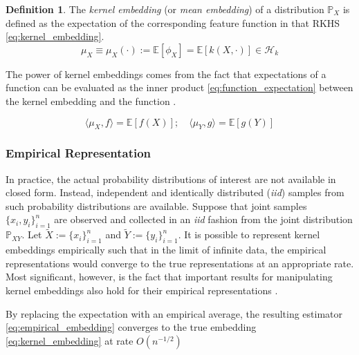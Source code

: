\documentclass[twoside]{article} \usepackage{aistats2017}
\theoremstyle{definition}
\newtheorem{definition}{Definition}[section]
\theoremstyle{theorem}
\newcommand{\rv}[1]{{#1}}
\newcommand{\ds}[1]{\tilde{#1}}
\newcommand{\expect}[1]{{\mathbb{E}[#1]}}
\newcommand{\inner}[2]{{\langle #1, #2 \rangle}}
\newcommand{\Hk}{\mathcal{H}_{k}}
\newcommand{\muX}{\mu_{\rv{X}}}
\newcommand{\muY}{\mu_{\rv{Y}}}
\newcommand{\phiX}{\phi_{\rv{X}}}
\begin{document}
		\begin{definition} \label{def:kernel_embedding}
			\citep{smola2007hilbert}
			The \textit{kernel embedding} (or \textit{mean embedding}) of a distribution $\mathbb{P}_{\rv{X}}$ is defined as the expectation of the corresponding feature function in that RKHS \eqref{eq:kernel_embedding}.
			\begin{equation}
				\muX \equiv \muX(\cdot) := \expect{\phiX} = \expect{k(\rv{X}, \cdot)} \in \Hk
			\label{eq:kernel_embedding}
			\end{equation}
		\end{definition}
		
		The power of kernel embeddings comes from the fact that expectations of a function can be evaluated as the inner product \eqref{eq:function_expectation} between the kernel embedding and the function \citep{muandet2016kernel}.
		
		\begin{equation}
			\inner{\muX}{f} = \expect{f(\rv{X})} ;\quad \inner{\muY}{g} = \expect{g(\rv{Y})}
		\label{eq:function_expectation}
		\end{equation}

		
		\subsubsection{Empirical Representation}
		\label{sec:background:kernel_embeddings:empirical_representation}
			
			In practice, the actual probability distributions of interest are not available in closed form. Instead, independent and identically distributed (\textit{iid}) samples from such probability distributions are available. Suppose that joint samples $\{x_{i}, y_{i}\}_{i = 1}^{n}$ are observed and collected in an \textit{iid} fashion from the joint distribution $\mathbb{P}_{\rv{X} \rv{Y}}$. Let $\ds{X} := \{x_{i}\}_{i = 1}^{n}$ and $\ds{Y} := \{y_{i}\}_{i = 1}^{n}$. It is possible to represent kernel embeddings empirically such that in the limit of infinite data, the empirical representations would converge to the true representations at an appropriate rate. Most significant, however, is the fact that important results for manipulating kernel embeddings also hold for their empirical representations \citep{muandet2016kernel}.
			
			By replacing the expectation with an empirical average, the resulting estimator \eqref{eq:empirical_embedding} converges to the true embedding \eqref{eq:kernel_embedding} at rate $O(n^{-1/2})$ \citep{smola2007hilbert}
\end{document}

